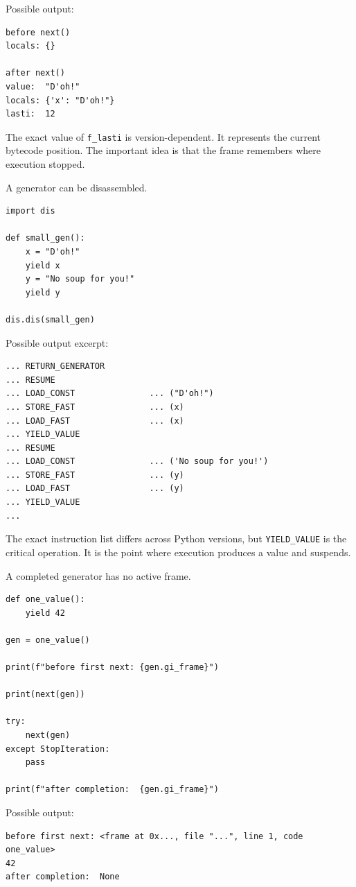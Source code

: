 Possible output:

\begin{verbatim}
before next()
locals: {}

after next()
value:  "D'oh!"
locals: {'x': "D'oh!"}
lasti:  12
\end{verbatim}

The exact value of \texttt{f\_lasti} is version-dependent. It represents the current bytecode position. The important idea is that the frame remembers where execution stopped.

A generator can be disassembled.

\begin{verbatim}
import dis

def small_gen():
    x = "D'oh!"
    yield x
    y = "No soup for you!"
    yield y

dis.dis(small_gen)
\end{verbatim}

Possible output excerpt:

\begin{verbatim}
... RETURN_GENERATOR
... RESUME
... LOAD_CONST               ... ("D'oh!")
... STORE_FAST               ... (x)
... LOAD_FAST                ... (x)
... YIELD_VALUE
... RESUME
... LOAD_CONST               ... ('No soup for you!')
... STORE_FAST               ... (y)
... LOAD_FAST                ... (y)
... YIELD_VALUE
...
\end{verbatim}

The exact instruction list differs across Python versions, but \texttt{YIELD\_VALUE} is the critical operation. It is the point where execution produces a value and suspends.

A completed generator has no active frame.

\begin{verbatim}
def one_value():
    yield 42

gen = one_value()

print(f"before first next: {gen.gi_frame}")

print(next(gen))

try:
    next(gen)
except StopIteration:
    pass

print(f"after completion:  {gen.gi_frame}")
\end{verbatim}

Possible output:

\begin{verbatim}
before first next: <frame at 0x..., file "...", line 1, code one_value>
42
after completion:  None
\end{verbatim}

